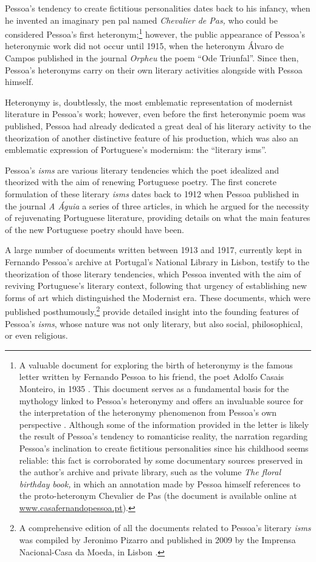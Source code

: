 \documentclass{article}
\begin{document}
Pessoa's tendency to create fictitious personalities dates back to his
infancy, when he invented an imaginary pen pal named \emph{Chevalier de
Pas,} who could be considered Pessoa's first heteronym;\footnote{A
  valuable document for exploring the birth of heteronymy is the famous
  letter written by Fernando Pessoa to his friend, the poet Adolfo
  Casais Monteiro, in 1935 \citep[251--262]{pessoa_cartas_1998}. This document serves
  as a fundamental basis for the mythology linked to Pessoa's heteronymy
  and offers an invaluable source for the interpretation of the
  heteronymy phenomenon from Pessoa's own perspective \citep{sousa_nos_2015}.
  Although some of the information provided in the letter is likely the
  result of Pessoa's tendency to romanticise reality, the narration
  regarding Pessoa's inclination to create fictitious personalities
  since his childhood seems reliable: this fact is corroborated by some
  documentary sources preserved in the author's archive and private
  library, such as the volume \emph{The floral birthday book,} in which
  an annotation made by Pessoa himself references to the proto-heteronym
  Chevalier de Pas (the document is available online at
  \url{www.casafernandopessoa.pt}).} however, the public appearance of
Pessoa's heteronymic work did not occur until 1915, when the heteronym
Álvaro de Campos published in the journal \emph{Orpheu} the poem ``Ode
Triunfal''. Since then, Pessoa's heteronyms carry on their own literary
activities alongside with Pessoa himself.

Heteronymy is, doubtlessly, the most emblematic representation of
modernist literature in Pessoa's work; however, even before the first
heteronymic poem was published, Pessoa had already dedicated a great
deal of his literary activity to the theorization of another distinctive
feature of his production, which was also an emblematic expression of
Portuguese's modernism: the ``literary isms''.

Pessoa's \emph{isms} are various literary tendencies which the poet
idealized and theorized with the aim of renewing Portuguese poetry. The
first concrete formulation of these literary \emph{isms} dates back to
1912 when Pessoa published in the journal \emph{A Águia} a series of
three articles, in which he argued for the necessity of rejuvenating
Portuguese literature, providing details on what the main features of
the new Portuguese poetry should have been.

A large number of documents written between 1913 and 1917, currently
kept in Fernando Pessoa's archive at Portugal's National Library in
Lisbon, testify to the theorization of those literary tendencies, which
Pessoa invented with the aim of reviving Portuguese's literary context,
following that urgency of establishing new forms of art which
distinguished the Modernist era. These documents, which were published
posthumously,\footnote{A comprehensive edition of all the documents
  related to Pessoa's literary \emph{isms} was compiled by Jeronimo
  Pizarro and published in 2009 by the Imprensa Nacional-Casa da Moeda,
  in Lisbon \parencite{pessoa_sensacionismo_2009}.} provide detailed insight into the founding features of
Pessoa's \emph{isms}, whose nature was not only literary, but also
social, philosophical, or even religious.
\end{document}
